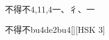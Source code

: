 \begin{entry}{不得不}{4,11,4}{⼀、⼻、⼀}
  \begin{phonetics}{不得不}{bu4de2bu4}[][HSK 3]
  \end{phonetics}
\end{entry}
